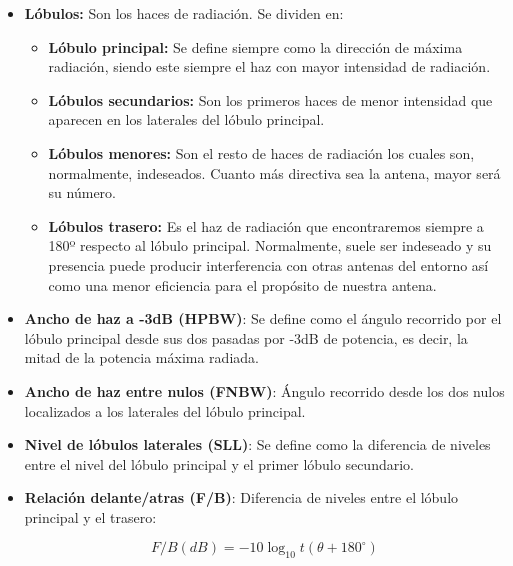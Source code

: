 \begin{itemize}

\item \textbf{Lóbulos: }Son los haces de radiación. Se dividen en:
	\begin{itemize}
	\item \textbf{Lóbulo principal: }Se define siempre como la dirección de máxima radiación, siendo este siempre el haz con mayor intensidad de radiación.
	\item \textbf{Lóbulos secundarios: }Son los primeros haces de menor intensidad que aparecen en los laterales del lóbulo principal. 
	\item \textbf{Lóbulos menores: }Son el resto de haces de radiación los cuales son, normalmente, indeseados. Cuanto más directiva sea la antena, mayor será su número. 
	\item \textbf{Lóbulos trasero: }Es el haz de radiación que encontraremos siempre a 180º respecto al lóbulo principal. Normalmente, suele ser indeseado y su presencia puede producir interferencia con otras antenas del entorno así como una menor eficiencia para el propósito de nuestra antena.
	\end{itemize}	

\item \textbf{Ancho de haz a -3dB (HPBW)}: Se define como el ángulo recorrido por el lóbulo principal desde sus dos pasadas por -3dB de potencia, es decir, la mitad de la potencia máxima radiada. 

\item \textbf{Ancho de haz entre nulos (FNBW)}: Ángulo recorrido desde los dos nulos localizados a los laterales del lóbulo principal.

\item \textbf{Nivel de lóbulos laterales (SLL)}: Se define como la diferencia de niveles entre el nivel del lóbulo principal y el primer lóbulo secundario.

\item \textbf{Relación delante/atras (F/B)}: Diferencia de niveles entre el lóbulo principal y el trasero: 

\begin{equation}
	F/B(dB)=-10\log_{10}t(\theta+180^{\circ})
	\label{eq:fb}
\end{equation}

\end{itemize}

